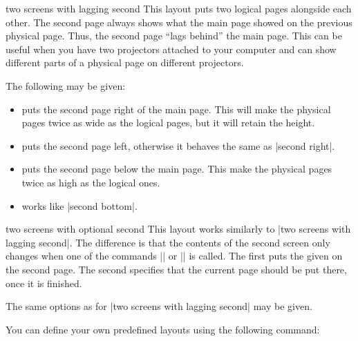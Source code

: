 \begin{pgflayout}{two screens with lagging second}
  This layout puts two logical pages alongside each other. The second
  page always shows what the main
  page showed on the previous physical page. Thus, the second page
  ``lags behind'' the main page. This can be useful when you have two
  projectors attached to your computer and can show different parts of
  a physical page on different projectors.

  The following  may be given:
  \begin{itemize}
  \item {} puts the second page right of the
    main page. This will make the physical pages twice as wide
    as the logical pages, but it will retain the height.
  \item {} puts the second page left,
    otherwise it behaves the same as |second right|.
  \item {} puts the second page below the main
    page. This make the physical pages twice as high as the logical
    ones.
  \item {} works like |second bottom|.
  \end{itemize}
\end{pgflayout}

\begin{pgflayout}{two screens with optional second}
  This layout works similarly to
  |two screens with lagging second|. The difference is that the
  contents of the second screen only changes when one of the commands
  || or
  || is called. The first puts the
  given  on the second page. The second specifies that the
  current page should be put there, once it is finished.

  The same options as for |two screens with lagging second| may be
  given.
\end{pgflayout}



You can define your own predefined layouts using the following
command:

